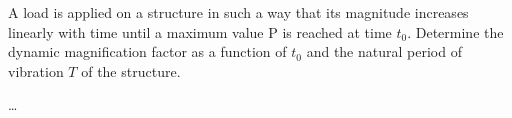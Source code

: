
\begin{Exercise}[label=ramp_force]
A load is applied on a structure in such a way that its magnitude increases linearly with time until a maximum value P is reached at time $t_0$. Determine the dynamic magnification factor as a function of $t_0$ and the natural period of vibration $T$ of the structure.

\begin{center}
\end{center}

\shortAnswer \dots
\end{Exercise}


\begin{Answer}[ref=ramp_force]

\end{Answer}